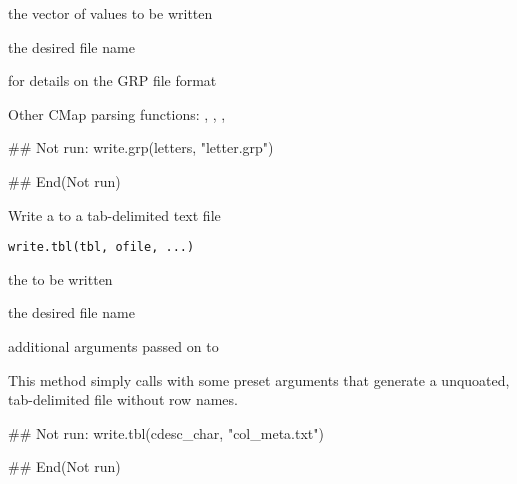 \documentclass[letterpaper]{book}
\begin{document}
%
\begin{Arguments}
\begin{ldescription}
\item[\code{vals}] the vector of values to be written

\item[\code{fname}] the desired file name
\end{ldescription}
\end{Arguments}
%
\begin{SeeAlso}\relax
{} for details on the GRP file format

Other CMap parsing functions: ,
, ,
\end{SeeAlso}
%
\begin{Examples}
\begin{ExampleCode}
## Not run: 
write.grp(letters, "letter.grp")

## End(Not run)

\end{ExampleCode}
\end{Examples}
%
\begin{Description}\relax
Write a  to a tab-delimited text file
\end{Description}
%
\begin{Usage}
\begin{verbatim}
write.tbl(tbl, ofile, ...)
\end{verbatim}
\end{Usage}
%
\begin{Arguments}
\begin{ldescription}
\item[\code{tbl}] the  to be written

\item[\code{ofile}] the desired file name

\item[\code{...}] additional arguments passed on to 
\end{ldescription}
\end{Arguments}
%
\begin{Details}\relax
This method simply calls  with some
preset arguments that generate a unquoated, tab-delimited file
without row names.
\end{Details}
%
\begin{SeeAlso}\relax
{}
\end{SeeAlso}
%
\begin{Examples}
\begin{ExampleCode}
## Not run: 
write.tbl(cdesc_char, "col_meta.txt")

## End(Not run)

\end{ExampleCode}
\end{Examples}
\printindex{}
\end{document}
